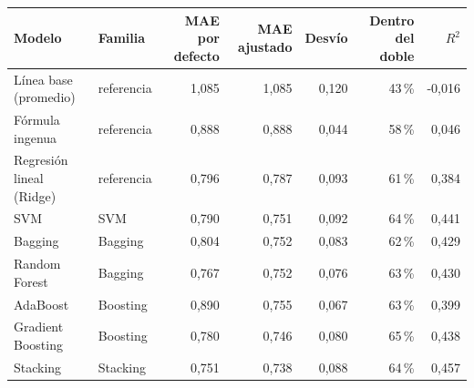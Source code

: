 \begin{tabular}{llrrrrr}
\toprule
Modelo & Familia & MAE por defecto & MAE ajustado & Desvío & Dentro del doble & $R^2$ \\
\midrule
Línea base (promedio) & referencia & 1,085 & 1,085 & 0,120 & 43\,\% & -0,016 \\
Fórmula ingenua & referencia & 0,888 & 0,888 & 0,044 & 58\,\% & 0,046 \\
Regresión lineal (Ridge) & referencia & 0,796 & 0,787 & 0,093 & 61\,\% & 0,384 \\
SVM & SVM & 0,790 & 0,751 & 0,092 & 64\,\% & 0,441 \\
Bagging & Bagging & 0,804 & 0,752 & 0,083 & 62\,\% & 0,429 \\
Random Forest & Bagging & 0,767 & 0,752 & 0,076 & 63\,\% & 0,430 \\
AdaBoost & Boosting & 0,890 & 0,755 & 0,067 & 63\,\% & 0,399 \\
Gradient Boosting & Boosting & 0,780 & 0,746 & 0,080 & 65\,\% & 0,438 \\
Stacking & Stacking & 0,751 & 0,738 & 0,088 & 64\,\% & 0,457 \\
\bottomrule
\end{tabular}
